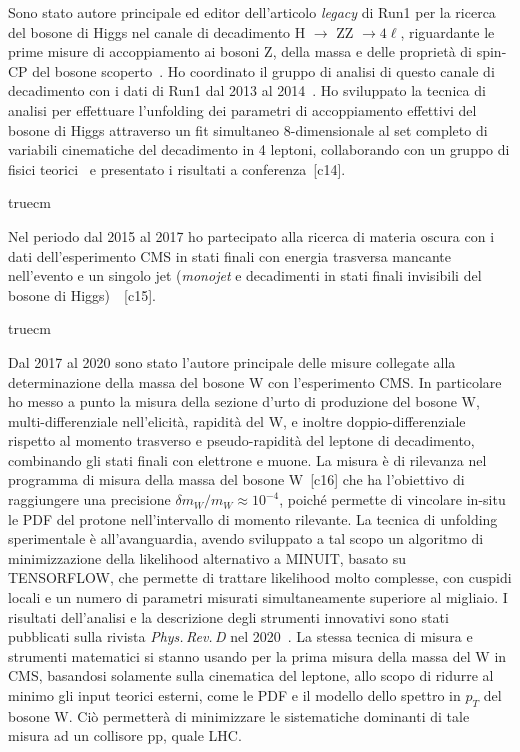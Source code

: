 \documentclass[11pt,twoside,a4paper]{article}
\begin{document}
Sono stato autore principale ed editor dell'articolo \textit{legacy}
di Run1 per la ricerca del bosone di Higgs nel canale di decadimento H
$\to$ ZZ $\to 4\ell$, riguardante le prime misure di accoppiamento ai
bosoni Z, della massa e delle propriet\`a di spin-CP del bosone
scoperto~\cite{Chatrchyan:2013mxa}. Ho coordinato il gruppo di analisi
di questo canale di decadimento con i dati di Run1 dal 2013 al
2014~\cite{Khachatryan:2014kca}. Ho sviluppato la tecnica di analisi
per effettuare l'unfolding dei parametri di accoppiamento effettivi
del bosone di Higgs attraverso un fit simultaneo 8-dimensionale al set
completo di variabili cinematiche del decadimento in 4 leptoni,
collaborando con un gruppo di fisici teorici~\cite{Chen:2014pia} e
presentato i risultati a conferenza~[c14].

 truecm

Nel periodo dal 2015 al 2017 ho partecipato alla ricerca di materia
oscura con i dati dell'esperimento CMS in stati finali con energia
trasversa mancante nell'evento e un singolo jet (\textit{monojet} e
decadimenti in stati finali invisibili del bosone di
Higgs)~\cite{Sirunyan:2017hci,Sirunyan:2017jix}~[c15].

 truecm

Dal 2017 al 2020 sono stato l'autore principale delle misure collegate
alla determinazione della massa del bosone W con l'esperimento CMS. In
particolare ho messo a punto la misura della sezione d'urto di
produzione del bosone W, multi-differenziale nell'elicit\`a,
rapidit\`a del W, e inoltre doppio-differenziale rispetto al momento
trasverso e pseudo-rapidit\`a del leptone di decadimento, combinando
gli stati finali con elettrone e muone. La misura \`e di rilevanza nel
programma di misura della massa del bosone W~[c16] che ha l'obiettivo
di raggiungere una precisione $\delta m_W/m_W\approx 10^{-4}$,
poich\'e permette di vincolare in-situ le PDF del protone
nell'intervallo di momento rilevante. La tecnica di unfolding
sperimentale \`e all'avanguardia, avendo sviluppato a tal scopo un
algoritmo di minimizzazione della likelihood alternativo a
\textsc{MINUIT}, basato su \textsc{TENSORFLOW}, che permette di
trattare likelihood molto complesse, con cuspidi locali e un numero di
parametri misurati simultaneamente superiore al migliaio. I risultati
dell'analisi e la descrizione degli strumenti innovativi sono stati
pubblicati sulla rivista \textit{Phys.\,Rev.\,D} nel
2020~\cite{CMS:2020cph}. La stessa tecnica di misura e strumenti
matematici si stanno usando per la prima misura della massa del W in
CMS, basandosi solamente sulla cinematica del leptone, allo scopo di
ridurre al minimo gli input teorici esterni, come le PDF e il modello
dello spettro in $p_T$ del bosone W.  Ci\`o permetter\`a di
minimizzare le sistematiche dominanti di tale misura ad un collisore
pp, quale LHC.
\end{document}
